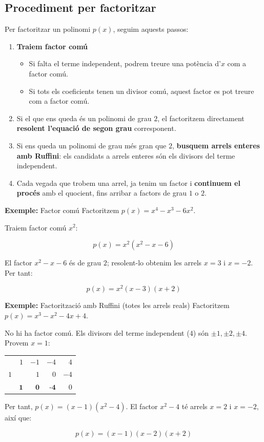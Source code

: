 \subsection{Procediment per factoritzar}

Per factoritzar un polinomi $p(x)$, seguim aquests passos:

\begin{enumerate}
\item \textbf{Traiem factor comú}

\begin{itemize}
\item Si falta el terme independent, podrem treure una potència d'$x$ com a factor comú.
\item Si tots els coeficients tenen un divisor comú, aquest factor es pot treure com a factor comú.
\end{itemize}
\item Si el que ens queda és un polinomi de grau $2$, el factoritzem directament \textbf{resolent l'equació de segon grau} corresponent.
\item Si ens queda un polinomi de grau més gran que $2$, \textbf{busquem arrels enteres amb Ruffini}: els candidats a arrels enteres són els divisors del terme independent.
\item Cada vegada que trobem una arrel, ja tenim un factor i \textbf{continuem el procés} amb el quocient, fins arribar a factors de grau $1$ o $2$.
\end{enumerate}

\begin{exemple}{\textbf{Exemple:} Factor comú}
Factoritzem $p(x) = x^4 - x^3 - 6x^2$.

Traiem factor comú $x^2$:

\[
p(x) = x^2(x^2-x-6)
\]

El factor $x^2-x-6$ és de grau $2$; resolent-lo obtenim les arrels $x=3$ i $x=-2$. Per tant:

\[
p(x) = x^2(x-3)(x+2)
\]
\end{exemple}

\begin{exemple}{\textbf{Exemple:} Factorització amb Ruffini (totes les arrels reals)}
Factoritzem $p(x) = x^3-x^2-4x+4$.

No hi ha factor comú. Els divisors del terme independent ($4$) són $\pm 1,\pm 2,\pm 4$. Provem $x=1$:

\begin{center}
\renewcommand{\arraystretch}{1.25}
\begin{tabular}{r|rrrr}
 & $1$ & $-1$ & $-4$ & $4$ \\
$1$ &  & $1$ & $0$ & $-4$ \\ \hline
 & $\textbf{1}$ & $\textbf{0}$ & $\textbf{-4}$ & $\boxed{0}$ \\
\end{tabular}
\end{center}

Per tant, $p(x) = (x-1)(x^2-4)$. El factor $x^2-4$ té arrels $x=2$ i $x=-2$, així que:

\[
p(x) = (x-1)(x-2)(x+2)
\]
\end{exemple}

